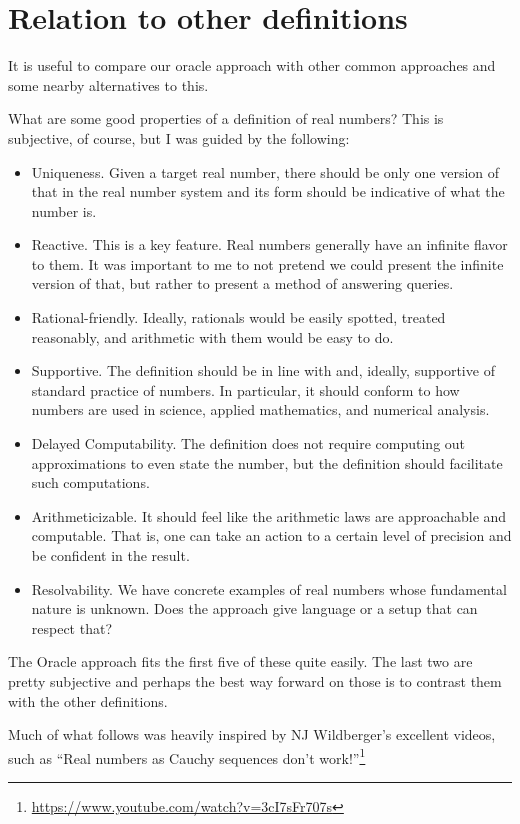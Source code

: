 \documentclass[12pt]{article}
\theoremstyle{remark}
\begin{document}
\section{Relation to other definitions}\label{sec:others}

It is useful to compare our oracle approach with other common approaches and some nearby alternatives to this. 

What are some good properties of a definition of real numbers? This is subjective, of course, but I was guided by the following: 

\begin{itemize}
    \item Uniqueness. Given a target real number, there should be only one version of that in the real number system and its form should be indicative of what the number is. 
    \item Reactive. This is a key feature. Real numbers generally have an infinite flavor to them. It was important to me to not pretend we could present the infinite version of that, but rather to present a method of answering queries. 
    \item Rational-friendly. Ideally, rationals would be easily spotted, treated reasonably, and arithmetic with them would be easy to do. 
    \item Supportive. The definition should be in line with and, ideally, supportive of standard practice of numbers. In particular, it should conform to how numbers are used in science, applied mathematics, and numerical analysis. 
    \item Delayed Computability. The definition does not require computing out approximations to even state the number, but the definition should facilitate such computations. 
    \item Arithmeticizable. It should feel like the arithmetic laws are approachable and computable. That is, one can take an action to a certain level of precision and be confident in the result.
    \item Resolvability. We have concrete examples of real numbers whose fundamental nature is unknown. Does the approach give language or a setup that can respect that? 
\end{itemize}

The Oracle approach fits the first five of these quite easily. The last two are pretty subjective and perhaps the best way forward on those is to contrast them with the other definitions. 

Much of what follows was heavily inspired by NJ Wildberger's excellent videos, such as ``Real numbers as Cauchy sequences don't work!''\footnote{\url{https://www.youtube.com/watch?v=3cI7sFr707s}}
\end{document}
